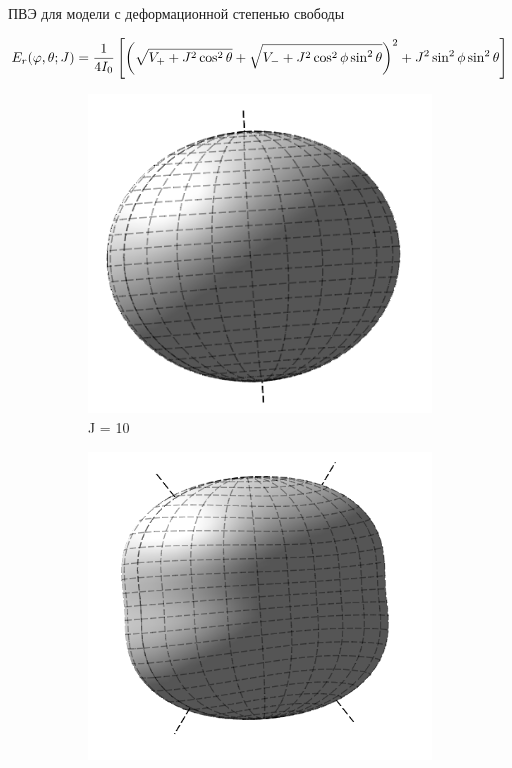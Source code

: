 \documentclass[hyperref={pdfpagelabels=false},usepdftitle=false, xcolor = dvipsnames]{beamer}
\begin{document}
\begin{frame}{ПВЭ для модели с деформационной степенью свободы}
  \begin{varblock}[11cm]{}

	 \scriptsize \begin{gather}
	  E_r (\varphi, \theta; J) = \frac{1}{4I_0} \left[ \left( \sqrt{V_{+} + J^2 \cos^2 \theta} + \sqrt{V_{-} + J^2 \cos^2 \phi \sin^2 \theta} \right)^2 + J^2 \sin^2 \phi \sin^2 \theta \right] \notag
	  \end{gather}
	\vspace*{-0.5cm}
  	  \begin{figure}
  	    \begin{subfigure}{0.3\textwidth}
		  \includegraphics[width=\textwidth]{../pictures/Rigid_RES_10.png}
		  \caption{J = 10}
	    \end{subfigure}
	    \begin{subfigure}{0.3\textwidth}
		  \includegraphics[width=\textwidth]{../pictures/Rigid_RES_30.png}

\end{subfigure}
\end{figure}
\end{varblock}
\end{frame}
\end{document}
